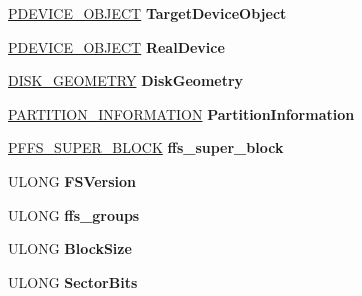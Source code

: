 \begin{DoxyCompactItemize}
\mbox{\label{struct___f_f_s___v_c_b_ab8911829b502ef6e0c08ae97161ecac4}} 
\hyperlink{struct___d_e_v_i_c_e___o_b_j_e_c_t}{P\+D\+E\+V\+I\+C\+E\+\_\+\+O\+B\+J\+E\+CT} {\bfseries Target\+Device\+Object}
\item 
\mbox{\label{struct___f_f_s___v_c_b_ad63553ea0fe358917d9f46a07cc570a0}} 
\hyperlink{struct___d_e_v_i_c_e___o_b_j_e_c_t}{P\+D\+E\+V\+I\+C\+E\+\_\+\+O\+B\+J\+E\+CT} {\bfseries Real\+Device}
\item 
\mbox{\label{struct___f_f_s___v_c_b_a7560d52952fb6b0c7819adae417e2134}} 
\hyperlink{struct___d_i_s_k___g_e_o_m_e_t_r_y}{D\+I\+S\+K\+\_\+\+G\+E\+O\+M\+E\+T\+RY} {\bfseries Disk\+Geometry}
\item 
\mbox{\label{struct___f_f_s___v_c_b_a2d30b4383b9beef21fca68d3a0a6e382}} 
\hyperlink{struct___p_a_r_t_i_t_i_o_n___i_n_f_o_r_m_a_t_i_o_n}{P\+A\+R\+T\+I\+T\+I\+O\+N\+\_\+\+I\+N\+F\+O\+R\+M\+A\+T\+I\+ON} {\bfseries Partition\+Information}
\item 
\mbox{\label{struct___f_f_s___v_c_b_ab069c9477a11c981699209c9b192b568}} 
\hyperlink{structfs}{P\+F\+F\+S\+\_\+\+S\+U\+P\+E\+R\+\_\+\+B\+L\+O\+CK} {\bfseries ffs\+\_\+super\+\_\+block}
\item 
\mbox{\label{struct___f_f_s___v_c_b_a8490b88f9f55cf024ff6d75827646baf}} 
U\+L\+O\+NG {\bfseries F\+S\+Version}
\item 
\mbox{\label{struct___f_f_s___v_c_b_a34f9fe179fb418f938b65fa3ce16834a}} 
U\+L\+O\+NG {\bfseries ffs\+\_\+groups}
\item 
\mbox{\label{struct___f_f_s___v_c_b_a9d556770740472f5c872576bb12563b0}} 
U\+L\+O\+NG {\bfseries Block\+Size}
\item 
\mbox{\label{struct___f_f_s___v_c_b_a0efdf4676553d07a6f8ccd6c06f9e966}} 
U\+L\+O\+NG {\bfseries Sector\+Bits}
\item 
\mbox{\label{struct___f_f_s___v_c_b_afcb6e1c9c7991a5d1539c93be918fb90}} 

\end{DoxyCompactItemize}
